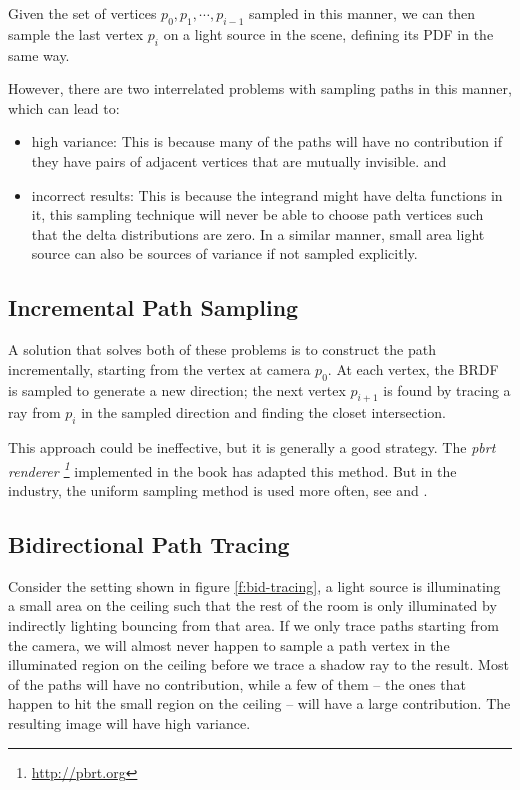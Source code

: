 Given the set of vertices $p_0,p_1,\cdots,p_{i-1}$ sampled in this manner, we can then sample the last vertex $p_i$ on a light source in the scene, defining its PDF in the same way.

However, there are two interrelated problems with sampling paths in this manner, which can lead to:

\begin{itemize}
	\item high variance: This is because many of the paths will have no contribution if they have pairs of adjacent vertices that are mutually invisible. and
	\item incorrect results: This is because the integrand might have delta functions in it, this sampling technique will never be able to choose path vertices such that the delta distributions are zero. In a similar manner, small area light source can also be sources of variance if not sampled explicitly.
\end{itemize} 


\subsection{Incremental Path Sampling}
A solution that solves both of these problems is to construct the path incrementally, starting from the vertex at camera $p_0$. At each vertex, the BRDF is sampled to generate a new direction; the next vertex $p_{i+1}$ is found by tracing a ray from $p_i$ in the sampled direction and finding the closet intersection.

This approach could be ineffective, but it is generally a good strategy. The \textit{pbrt renderer \footnote{\url{http://pbrt.org}}} implemented in the book \cite[-20mm]{b:pbrt} has adapted this method. But in the industry, the uniform sampling method is used more often, see \cite[-10mm]{a:ThePathTracingRevolutionintheMovieIndustry} and \cite{a:PathtracinginRenderMan}.


\subsection{Bidirectional Path Tracing}\label{sec:bidirectional-path-tracing}
Consider the setting shown in figure \ref{f:bid-tracing}, a light source is illuminating a small area on the ceiling such that the rest of the room is only illuminated by indirectly lighting bouncing from that area. If we only trace paths starting from the camera, we will almost never happen to sample a path vertex in the illuminated region on the ceiling before we trace a shadow ray to the result. Most of the paths will have no contribution, while a few of them -- the ones that happen to hit the small region on the ceiling -- will have a large contribution. The resulting image will have high variance. 

